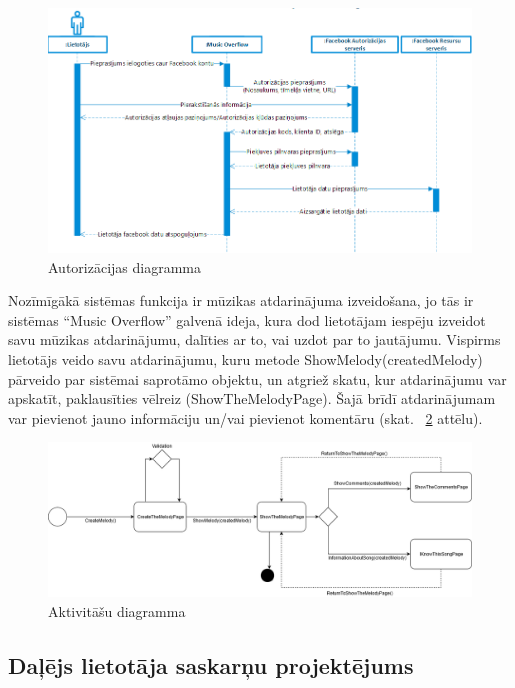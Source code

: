 \documentclass[12pt]{article}
\begin{document}
\begin{figure}[H]
\begin{center}
	\includegraphics[scale=0.6]{Oauth_flow.png}
	\caption{Autorizācijas diagramma}
	\label{fig:oauth_flow}
\end{center}
\end{figure}

Nozīmīgākā sistēmas funkcija ir mūzikas atdarinājuma izveidošana, jo tās ir sistēmas ``Music Overflow'' galvenā ideja, kura dod lietotājam iespēju izveidot savu mūzikas atdarinājumu, dalīties ar to, vai uzdot par to jautājumu. 
Vispirms lietotājs veido savu atdarinājumu, kuru metode ShowMelody(createdMelody) pārveido par sistēmai saprotāmo objektu, un atgriež skatu, kur atdarinājumu var apskatīt, paklausīties vēlreiz (ShowTheMelodyPage). Šajā brīdī atdarinājumam var pievienot jauno informāciju un/vai pievienot komentāru (skat. ~\ref{fig:activity_diagram} attēlu).

\begin{figure}[H]
\begin{center}
	\includegraphics[width=\linewidth,scale=0.5]{ActivityDiagram.png}
	\caption{Aktivitāšu diagramma}
	\label{fig:activity_diagram}
\end{center}
\end{figure}

\subsection{Daļējs lietotāja saskarņu projektējums}
\end{document}
